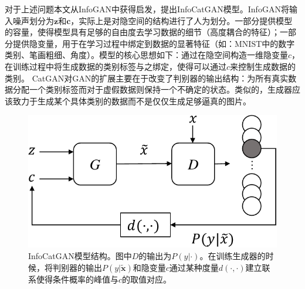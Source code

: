 对于上述问题本文从InfoGAN中获得启发，提出InfoCatGAN模型。InfoGAN将输入噪声划分为$\mathbf{z}$和$\mathbf{c}$，实际上是对隐空间的结构进行了人为划分。一部分提供模型的容量，使得模型具有足够的自由度去学习数据的细节（高度耦合的特征）；一部分提供隐变量，用于在学习过程中绑定到数据的显著特征（如：MNIST中的数字类别、笔画粗细、角度）。模型的核心思想如下：通过在隐空间构造一维隐变量$c$，在训练过程中将生成数据的类别标签与之绑定，使得可以通过$c$来控制生成数据的类别。
CatGAN对GAN的扩展主要在于改变了判别器的输出结构：为所有真实数据分配一个类别标签而对于虚假数据则保持一个不确定的状态。类似的，生成器应该致力于生成某个具体类别的数据而不是仅仅生成足够逼真的图片。

\begin{figure}[htbp]
  \centering
  \includegraphics[width=.5\textwidth]{Img/icg-arch.pdf} 
  \caption{InfoCatGAN模型结构。图中$D$的输出为$P(y|\cdot)$。在训练生成器的时候，将判别器的输出$P(y|\tilde{\mathbf{x}})$和隐变量$c$通过某种度量$d(\cdot, \cdot)$建立联系使得条件概率的峰值与$c$的取值对应。}
  \label{fig:icg-arch}
\end{figure}

